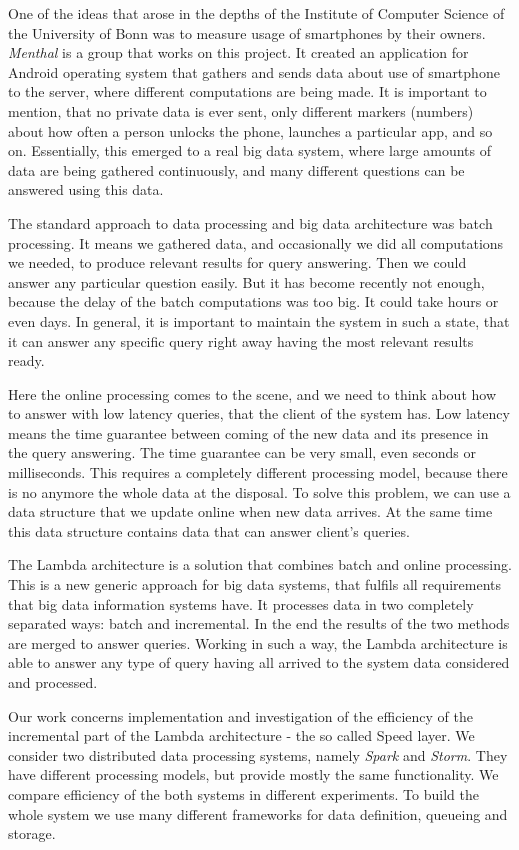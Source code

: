 One of the ideas that arose in the depths of the Institute of Computer Science of the University of Bonn was to measure usage of smartphones by their owners.
\textit{Menthal} is a group that works on this project.
It created an application for Android operating system that gathers and sends data about use of smartphone to the server, where different computations are being made.
It is important to mention, that no private data is ever sent, only different markers (numbers) about how often a person unlocks the phone, launches a particular app, and so on.
Essentially, this emerged to a real big data system, where large amounts of data are being gathered continuously, and many different questions can be answered using this data.

The standard approach to data processing and big data architecture was batch processing.
It means we gathered data, and occasionally we did all computations we needed, to produce relevant results for query answering.
Then we could answer any particular question easily.
But it has become recently not enough, because the delay of the batch computations was too big.
It could take hours or even days.
In general, it is important to maintain the system in such a state, that it can answer any specific query right away having the most relevant results ready.

Here the online processing comes to the scene, and we need to think about how to answer with low latency queries, that the client of the system has.
Low latency means the time guarantee between coming of the new data and its presence in the query answering.
The time guarantee can be very small, even seconds or milliseconds.
This requires a completely different processing model, because there is no anymore the whole data at the disposal.
To solve this problem, we can use a data structure that we update online when new data arrives.
At the same time this data structure contains data that can answer client's queries.

The Lambda architecture is a solution that combines batch and online processing.
This is a new generic approach for big data systems, that fulfils all requirements that big data information systems have.
It processes data in two completely separated ways: batch and incremental.
In the end the results of the two methods are merged to answer queries.
Working in such a way, the Lambda architecture is able to answer any type of query having all arrived to the system data considered and processed.

Our work concerns implementation and investigation of the efficiency of the incremental part of the Lambda architecture - the so called Speed layer.
We consider two distributed data processing systems, namely \textit{Spark} and \textit{Storm}.
They have different processing models, but provide mostly the same functionality.
We compare efficiency of the both systems in different experiments.
To build the whole system we use many different frameworks for data definition, queueing and storage.


